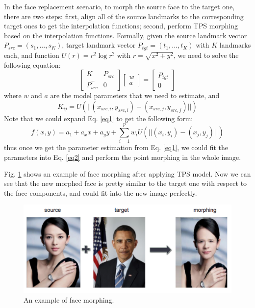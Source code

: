 \documentclass[10pt,twocolumn,letterpaper]{article}
\begin{document}
In the face replacement scenario, to morph the source face to the target one, there are two steps: first, align all of the source landmarks to the corresponding target ones to get the interpolation functions; second, perform TPS morphing based on the interpolation functions. Formally, given the source landmark vector $P_{src} = (s_1, ..., s_K)$, target landmark vector $P_{tgt} = (t_1, ..., t_K)$ with $K$ landmarks each, and function $U(r) = r^2 \log r^2$ with $r = \sqrt{x^2 + y^2}$, we need to solve the following equation:
\begin{equation}
\label{eq1}
\begin{bmatrix}
K & P_{src} \\
P_{src}^\top & 0
\end{bmatrix}
\begin{bmatrix}
w \\
a 
\end{bmatrix}
= 
\begin{bmatrix}
P_{tgt} \\
0
\end{bmatrix}
\end{equation}
where $w$ and $a$ are the model parameters that we need to estimate, and 
\begin{equation*}
K_{ij} = U(||(x_{src, i}, y_{src, i}) - (x_{src, j}, y_{src, j})||)
\end{equation*}
Note that we could expand Eq. \ref{eq1} to get the following form:
\begin{equation}
\label{eq2}
f(x, y) = a_1 + a_xx + a_yy + \sum_{i=1}^pw_iU(||(x_{i}, y_{i}) - (x_{j}, y_{j})||)
\end{equation}
thus once we get the parameter estimation from Eq. \ref{eq1}, we could fit the parameters into Eq. \ref{eq2} and perform the point morphing in the whole image. 

Fig. \ref{fig:morphing} shows an example of face morphing after applying TPS model. Now we can see that the new morphed face is pretty similar to the target one with respect to the face components, and could fit into the new image perfectly.
\begin{figure}
\begin{center}
   \includegraphics[width=0.8\linewidth]{fig/morphing.png}
\end{center}
   \caption{An example of face morphing.}
\label{fig:morphing}
\end{figure}
\end{document}
